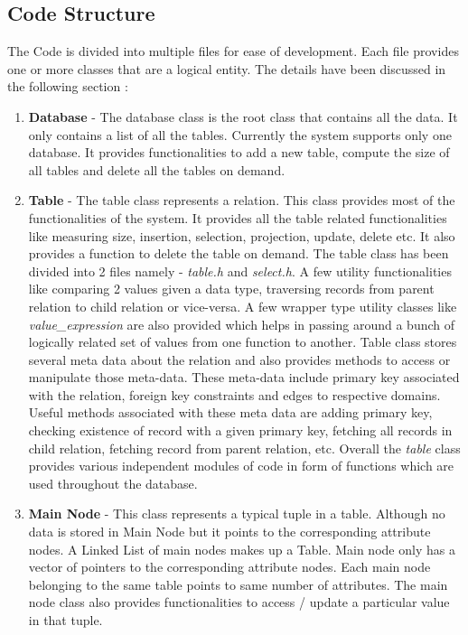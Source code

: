 \documentclass[12pt, oneside]{book}
\begin{document}
\subsection{Code Structure}
The Code is divided into multiple files for ease of development. Each file provides one or more classes that are a logical entity. The details have been discussed in the following section :
\begin{enumerate}
 \item \textbf{Database} - The database class is the root class that contains all the data. It only contains a list of all the tables. Currently the system supports only one database. It provides functionalities to add a new table, compute the size of all tables and delete all the tables on demand.
 \item \textbf{Table} - The table class represents a relation. This class provides most of the functionalities of the system. It provides all the table related functionalities like measuring size, insertion, selection, projection, update, delete etc. It also provides a function to delete the table on demand. The table class has been divided into 2 files namely - \emph{table.h} and \emph{select.h}. A few utility functionalities like comparing 2 values given a data type, traversing records from parent relation to child relation or vice-versa. A few wrapper type utility classes like \emph{value\_expression} are also provided which helps in passing around a bunch of logically related set of values from one function to another. Table class stores several meta data about the relation and also provides methods to access or manipulate those meta-data. These meta-data include primary key associated with the relation, foreign key constraints and edges to respective domains. Useful methods associated with these meta data are adding primary key, checking existence of record with a given primary key, fetching all records in child relation, fetching record from parent relation, etc. Overall the \emph{table} class provides various independent modules of code in form of functions which are used throughout the database.
 \item \textbf{Main Node} - This class represents a typical tuple in a table. Although no data is stored in Main Node but it points to the corresponding attribute nodes. A Linked List of main nodes makes up a Table. Main node only has a vector of pointers to the corresponding attribute nodes. Each main node belonging to the same table points to same number of attributes. The main node class also provides functionalities to access / update a particular value in that tuple.

\end{enumerate}
\end{document}
